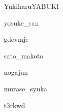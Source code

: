 \documentclass[mingoth,a4paper]{jsarticle}
\begin{document}
{{\begin{prework}{YukiharuYABUKI}
\end{prework}

\begin{prework}{ yosuke\_san }
\end{prework}

\begin{prework}{gdevmjc}
\end{prework}

\begin{prework}{sato\_makoto}
\end{prework}

\begin{prework}{nogajun}
\end{prework}

\begin{prework}{murase\_syuka}
\end{prework}

\begin{prework}{t3rkwd}
\end{prework}


\dancersection{$B2f$,2H$N2>A[%

\subsection{$B$O$8$a$K(B}
$B2f$,2H$N%

$B$?$@$7:,K\E*$JLdBj$H$7$F!"<B(BPC$B>e$G(Bqemu-kvm$B$d(Bqemu$B$r;H$C$FJ#?t$N(BVM$B$rAv$i$;$k;v$O%

$B$^$?!"0J2<$N;EMM$O%

}}}
\end{document}
